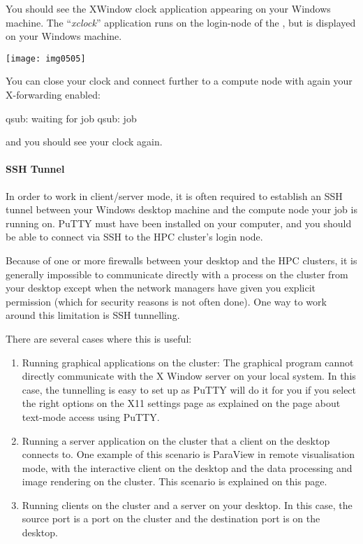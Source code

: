   You should see the XWindow clock application appearing on your Windows machine.
  The ``\emph{xclock}'' application runs on the login-node of the \hpc, but is
  displayed on your Windows machine.

  \begin{center}
  \texttt{[image: img0505]}
  \end{center}

  You can close your clock and connect further to a compute node with again your
  X-forwarding enabled:

\begin{prompt}
qsub: waiting for job %
qsub: job %
\end{prompt}

  and you should see your clock again.

  \paragraph{SSH Tunnel}
  \label{par:ssh-tunnel-windows}

  In order to work in client/server mode, it is often required to establish an
  SSH tunnel between your Windows desktop machine and the compute node your job
  is running on.  PuTTY must have been installed on your computer, and you should
  be able to connect via SSH to the HPC cluster's login node.

  Because of one or more firewalls between your desktop and the HPC clusters, it
  is generally impossible to communicate directly with a process on the cluster
  from your desktop except when the network managers have given you explicit
  permission (which for security reasons is not often done). One way to work
  around this limitation is SSH tunnelling.

  There are several cases where this is useful:

  \begin{enumerate}
  \item  Running graphical applications on the cluster: The graphical program cannot directly
    communicate with the X Window server on your local system. In this case, the
    tunnelling is easy to set up as PuTTY will do it for you if you select the
    right options on the X11 settings page as explained on the page about
    text-mode access using PuTTY.
  \item  Running a server application on the cluster that a client on the desktop
    connects to. One example of this scenario is ParaView in remote visualisation
    mode, with the interactive client on the desktop and the data processing and
    image rendering on the cluster. This scenario is explained on this page.
  \item  Running clients on the cluster and a server on your desktop. In this
    case, the source port is a port on the cluster and the destination port is on
    the desktop.
  \end{enumerate}

